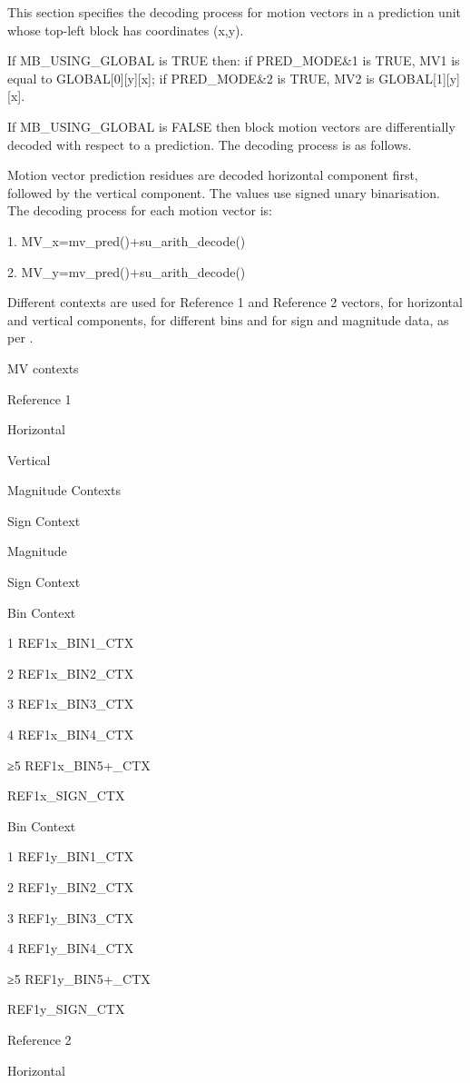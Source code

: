 This section specifies the decoding process for motion vectors in a
prediction unit whose top-left block has coordinates (x,y).

If MB\_USING\_GLOBAL is TRUE then: if PRED\_MODE\&1 is TRUE, MV1 is equal to
GLOBAL[0][y][x]; if PRED\_MODE\&2 is TRUE, MV2 is GLOBAL[1][y][x].

If MB\_USING\_GLOBAL is FALSE then block motion vectors are differentially
decoded with respect to a prediction.  The decoding process is as
follows.

Motion vector prediction residues are decoded horizontal component
first, followed by the vertical component. The values use signed unary
binarisation. The decoding process for each motion vector is:

1.      MV\_x=mv\_pred()+su\_arith\_decode()

2.      MV\_y=mv\_pred()+su\_arith\_decode()

Different contexts are used for Reference 1 and Reference 2 vectors, for
horizontal and vertical components, for different bins and for sign and
magnitude data, as per . 


MV contexts

Reference 1

Horizontal

Vertical

Magnitude Contexts

Sign Context

Magnitude

Sign Context

Bin   Context

1        REF1x\_BIN1\_CTX

2        REF1x\_BIN2\_CTX

3        REF1x\_BIN3\_CTX

4        REF1x\_BIN4\_CTX

≥5      REF1x\_BIN5+\_CTX

REF1x\_SIGN\_CTX          



Bin   Context

1        REF1y\_BIN1\_CTX

2        REF1y\_BIN2\_CTX

3        REF1y\_BIN3\_CTX

4        REF1y\_BIN4\_CTX

≥5      REF1y\_BIN5+\_CTX

REF1y\_SIGN\_CTX

Reference 2

Horizontal

